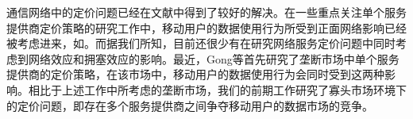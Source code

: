 通信网络中的定价问题已经在文献\cite{Walrand08,Huang10,Xinbin,CaoTVT,Xiaoming}中得到了较好的解决。在一些重点关注单个服务提供商定价策略的研究工作中，移动用户的数据使用行为所受到正面网络影响已经被考虑进来，如\cite{Hartline08,Candogan12,SwapnaES12}。而据我们所知，目前还很少有在研究网络服务定价问题中同时考虑到网络效应和拥塞效应的影响。最近，Gong等\cite{GongDCZ17}首先研究了垄断市场中单个服务提供商的定价策略，在该市场中，移动用户的数据使用行为会同时受到这两种影响。相比于上述工作中所考虑的垄断市场，我们的前期工作\cite{MYCISS16}研究了寡头市场环境下的定价问题，即存在多个服务提供商之间争夺移动用户的数据市场的竞争。


%
%
%
